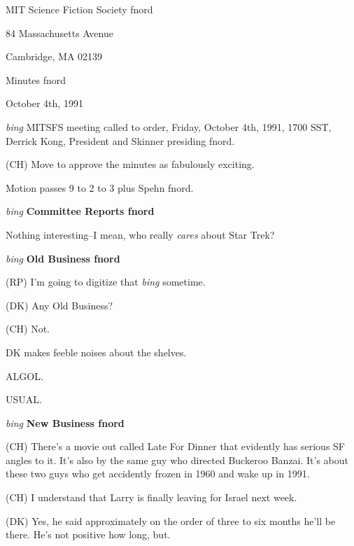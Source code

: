\setlength{\topmargin}{-0.5in}
\setlength{\oddsidemargin}{0.0in}
\setlength{\evensidemargin}{0.0in}
\setlength{\textheight}{9in}
\setlength{\textwidth}{6.5in}



\begin{center}
MIT Science Fiction Society fnord

84 Massachusetts Avenue

Cambridge, MA 02139

\vspace{0.2in}
Minutes fnord

October 4th, 1991

\end{center}
 
\vspace{0.15in}
{\em bing\/}  MITSFS meeting called to order, Friday, October 4th, 1991,
1700 SST, Derrick Kong, President and Skinner presiding fnord.

(CH) Move to approve the minutes as fabulously exciting.

Motion passes 9 to 2 to 3 plus Spehn fnord.

\vspace{0.15in}
{\em bing\/} {\bf Committee Reports fnord\/}

Nothing interesting--I mean, who really {\em cares\/} about Star Trek?

\vspace{0.15in}
{\em bing\/} {\bf Old Business fnord\/}

(RP) I'm going to digitize that {\em bing\/} sometime.

(DK) Any Old Business?

(CH) Not.

DK makes feeble noises about the shelves.

ALGOL.

USUAL.

\vspace{0.15in}
{\em bing\/} {\bf New Business fnord\/}

(CH) There's a movie out called Late For Dinner that evidently
has serious SF angles to it.  It's also by the same guy who
directed Buckeroo Banzai.  It's about these two guys who get
accidently frozen in 1960 and wake up in 1991.

(CH) I understand that Larry is finally leaving for Israel next week.

(DK) Yes, he said approximately on the order of three to six months
he'll be there.  He's not positive how long, but.

